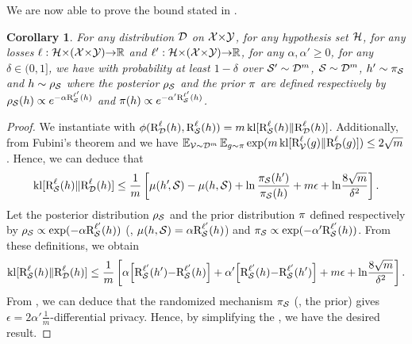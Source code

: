 \documentclass[twoside]{article}
\theoremstyle{plain}
\newtheorem{corollary}[theorem]{Corollary}
\begin{document}
We are now able to prove the bound stated in .

\begin{corollary}\label{corollary:disintegrated-differential-privacy}
For any distribution $\Dcal$ on $\Xcal{\times}\Ycal$, for any hypothesis set $\Hcal$, for any losses $\loss: \Hcal{\times}(\Xcal{\times}\Ycal){\to}\R$ and $\loss': \Hcal{\times}(\Xcal{\times}\Ycal){\to}\R$, for any $\alpha,\alpha'\ge0$, for any $\delta\in(0, 1]$, we have with probability at least $1-\delta$ over $\Scal'\sim\Dcal^m$, $\Scal\sim\Dcal^m$, $h'\sim\P_{\Scal}$ and $h\sim\AQ$
\eqcomparisondziugaite
where the posterior $\AQ$ and the prior $\P$ are defined respectively by $\AQ(h) \propto e^{-\alpha\RiskLossp_{\Scal}(h)}$ and $\P(h) \propto e^{-\alpha'\RiskLossp_{\Scal}(h)}$.
\end{corollary}
\begin{proof}
We instantiate   with $\phi(\RiskLoss_{\Dcal}(h), \RiskLoss_{\Scal}(h))=m\kl[\RiskLoss_{\Scal}(h) \|\RiskLoss_{\Dcal}(h)]$. 
Additionally, from Fubini's theorem and \citet{maurer2004note} we have $\EE_{\Vcal\sim\Dcal^m}\EE_{g\sim\P}\exp(m\kl[\RiskLoss_{\Vcal}(g) \|\RiskLoss_{\Dcal}(g)]) \leq 2\sqrt{m}$.
Hence, we can deduce that
\begin{align*}
    \kl[\RiskLoss_{\Scal}(h) \|\RiskLoss_{\Dcal}(h)] \le \frac{1}{m}\LB\comp(h'\!,\Scal) - \comp(h,\Scal) + \ln\frac{\P_{\Scal}(h')}{\P_{\Scal}(h)} + m\epsilon + \ln\!\frac{8\sqrt{m}}{\delta^2}\RB.
\end{align*}
Let the posterior distribution $\AQ$ and the prior distribution $\P$ defined respectively by $\AQ\propto \exp(-\alpha\RiskLossp_{\Scal}(h))$ (\ie, $\comp(h,\Scal)=\alpha\RiskLossp_{\Scal}(h)$) and $\P_{\Scal}\propto \exp(-\alpha'\RiskLossp_{\Scal}(h))$.
From these definitions, we obtain
\begin{align}
    \kl[\RiskLoss_{\Scal}(h) \|\RiskLoss_{\Dcal}(h)] \le \frac{1}{m}\LB \alpha\!\LB\RiskLossp_{\Scal}(h'){-}\RiskLossp_{\Scal}(h)\RB + \alpha'\!\LB\RiskLossp_{\Scal}(h){-}\RiskLossp_{\Scal}(h')\RB + m\epsilon + \ln\!\frac{8\sqrt{m}}{\delta^2}\RB.\label{eq:proof-corollary:disintegrated-differential-privacy-1}
\end{align}
From \citet[Theorem 6]{mcsherry2007mechanism}, we can deduce that the randomized mechanism $\P_{\Scal}$ (\ie, the prior) gives $\epsilon=2\alpha'\frac{1}{m}$-differential privacy.
Hence, by simplifying the , we have the desired result.
\end{proof}
\end{document}
